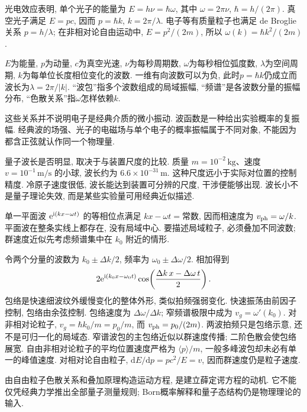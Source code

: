 光电效应表明, 单个光子的能量为 $E=h\nu=\hbar\omega$, 其中 $\omega=2\pi\nu$, $\hbar=h/(2\pi)$. 真空光子满足 $E=pc$, 因而 $p=\hbar k$, $k=2\pi/\lambda$. 电子等有质量粒子也满足 de Broglie关系 $p=h/\lambda$; 在非相对论自由运动中, $E=p^2/(2m)$, 所以 $\omega(k)=\hbar k^2/(2m)$.

$E$为能量, $p$为动量, $c$为真空光速, $\nu$为每秒周期数, $\omega$为每秒相位弧度数, $\lambda$为空间周期, $k$为每单位长度相位变化的波数. 一维有向波数可以为负, 此时$p=\hbar k$仍成立而波长为$\lambda=2\pi/|k|$. “波包”指多个波数组成的局域振幅, “频谱”是各波数分量的振幅分布, “色散关系”指$\omega$怎样依赖$k$.

这些关系并不说明电子是经典介质的微小振动. 波函数是一种给出实验概率的复振幅. 经典波的场强、光子的电磁场与单个电子的概率振幅属于不同对象, 不能因为都含正弦就认作同一个物理量.

量子波长是否明显, 取决于与装置尺度的比较. 质量 $m=10^{-2}\,\mathrm{kg}$、速度 $v=10^{-1}\,\mathrm{m/s}$ 的小球, 波长约为 $6.6\times10^{-31}\,\mathrm m$. 这种尺度远小于实际对位置的控制精度. 冷原子速度很低, 波长能达到装置可分辨的尺度, 干涉便能够出现. 波长小不是量子理论失效, 而是某些实验量可用经典近似描述.

单一平面波 $\mathrm e^{\mathrm i(kx-\omega t)}$ 的等相位点满足 $kx-\omega t=\text{常数}$, 因而相速度为 $v_{\rm ph}=\omega/k$. 平面波在整条实线上都存在, 没有局域中心. 要描述局域粒子, 必须叠加不同波数; 群速度近似先考虑频谱集中在 $k_0$ 附近的情形.

令两个分量的波数为 $k_0\pm\Delta k/2$, 频率为 $\omega_0\pm\Delta\omega/2$. 相加得到
\[
2\mathrm e^{\mathrm i(k_0x-\omega_0t)}\cos\!\left(\frac{\Delta k\,x-\Delta\omega\,t}{2}\right).
\]
包络是快速细波纹外缓慢变化的整体外形, 类似拍频强弱变化. 快速振荡由前因子控制, 包络由余弦控制. 包络速度为 $\Delta\omega/\Delta k$; 窄频谱极限中成为 $v_g=\omega'(k_0)$. 对非相对论粒子, $v_g=\hbar k_0/m=p_0/m$, 而 $v_{\rm ph}=p_0/(2m)$. 两波拍频只是包络示意, 还不是可归一化的局域态. 窄谱波包的主包络近似以群速度传播; 二阶色散会使包络展宽. 自由非相对论粒子的平均位置速度严格为 $\langle p\rangle/m$, 一般多峰波包却未必有单一的峰值速度. 对相对论自由粒子, $\mathrm dE/\mathrm dp=pc^2/E=v$, 因而群速度仍是粒子速度.

\begin{remark}
由自由粒子色散关系和叠加原理构造运动方程, 是建立薛定谔方程的动机. 它不能仅凭经典力学推出全部量子测量规则; Born概率解释和量子态结构仍是物理理论的输入.
\end{remark}

